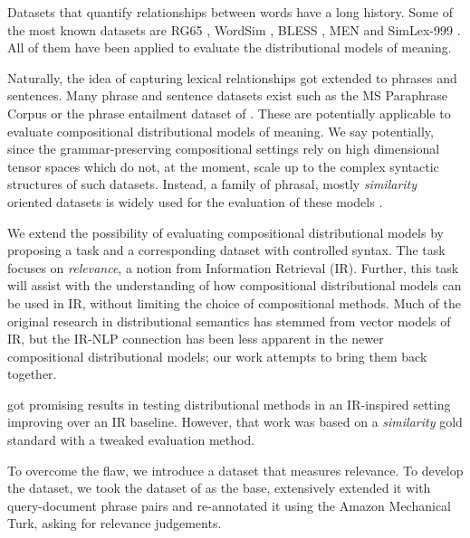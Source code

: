 Datasets that quantify relationships between words have a long history. Some of the most known datasets are RG65 \cite{Rubenstein:1965:CCS:365628.365657}, WordSim \cite{2002:PSC:503104.503110}, BLESS \cite{baroni-lenci:2011:GEMS}, MEN \cite{Bruni:2014:MDS:2655713.2655714} and SimLex-999 \cite{hill2014simlex}. All of them have been applied to evaluate the distributional models of meaning.

Naturally, the idea of capturing lexical relationships got extended to phrases and sentences. Many phrase and sentence datasets exist such as the MS Paraphrase Corpus \cite{dolan2005par} or the phrase entailment dataset of . These are potentially applicable to evaluate compositional distributional models of meaning. We say potentially, since the grammar-preserving compositional settings \cite{baroni2014frege,DBLP:journals/corr/abs-1003-4394}  rely on high dimensional tensor spaces which do not, at the moment, scale up to  the complex syntactic structures of such datasets. Instead, a family of phrasal, mostly \emph{similarity} oriented datasets \cite{mitchell-lapata:2008:ACLMain,Grefenstette:2011:ESC:2145432.2145580,kartsaklis-sadrzadeh:2013:EMNLP,kartsadrqpl2014} is widely used for the evaluation of these models \cite{milajevs-EtAl:2014:EMNLP2014,kim-demarneffe-foslerlussier:2015:VSM-NLP}.

We extend the possibility of evaluating compositional distributional models by proposing a task and a corresponding dataset  with controlled syntax. The task focuses on \emph{relevance}, a notion from Information Retrieval (IR).  Further, this task will assist with the understanding of how compositional distributional  models  can be used in IR, without limiting the choice of compositional methods. Much of the original research in distributional semantics has stemmed from vector models of IR, but the IR-NLP connection has been less apparent in  the newer compositional distributional models; our work attempts to bring them back together.

 got promising results in testing distributional methods in an IR-inspired setting improving over an IR baseline. However, that work was based on a \emph{similarity} gold standard with a tweaked evaluation method.

To overcome the flaw, we introduce a dataset that measures relevance. To develop the dataset, we took the  dataset of  as the base, extensively extended it with query-document phrase pairs and re-annotated it using the Amazon Mechanical Turk, asking for relevance judgements.

